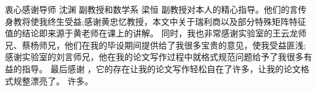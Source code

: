 \begin{acknowledgement}
  衷心感谢导师 沈渊 副教授和数学系 梁恒 副教授对本人的精心指导。他们的言传身教将使我终生受益;感谢黄忠忆教授，本文中关于瑞利商以及部分特殊矩阵特征值的结论即来源于黄老师在课上的讲解。
  同时，我也非常感谢实验室的王云龙师兄、蔡杨师兄，他们在我的毕设期间提供给了我很多宝贵的意见，使我受益匪浅;感谢实验室的刘言师兄，他在我的论文写作过程中就格式规范问题给予了我很多有益的指导。
  最后感谢 \thuthesis，它的存在让我的论文写作轻松自在了许多，让我的论文格式规整漂亮了。
  许多。
\end{acknowledgement}

